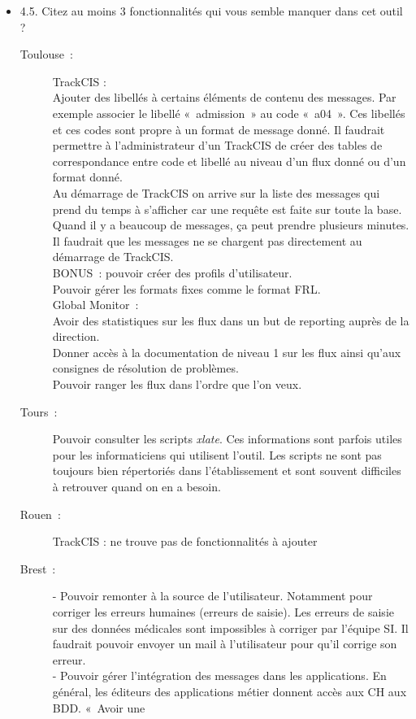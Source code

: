 \begin{itemize}
	  \item 4.5. Citez au moins 3 fonctionnalités qui vous semble manquer dans cet
	  outil ?
	  \begin{description}
	  	\item[Toulouse~:] TrackCIS :\\
		Ajouter des libellés à certains éléments de contenu des messages. Par exemple
		associer le libellé «~admission~» au code «~a04~». Ces libellés et ces codes
		sont propre à un format de message donné. Il faudrait permettre à
		l’administrateur d’un TrackCIS de créer des tables de correspondance entre code et
		libellé au niveau d’un flux donné ou d’un format donné.\\
		Au démarrage de TrackCIS on arrive sur la liste des messages qui prend du
		temps à s’afficher car une requête est faite sur toute la base. Quand il y a beaucoup
		de messages, ça peut prendre plusieurs minutes. Il faudrait que les messages
		ne se chargent pas directement au démarrage de TrackCIS.\\
		BONUS~: pouvoir créer des profils d’utilisateur.\\
		Pouvoir gérer les formats fixes comme le format FRL.\\
		Global Monitor~:\\
		Avoir des statistiques sur les flux dans un but de reporting auprès de la
		direction.\\
		Donner accès à la documentation de niveau 1 sur les flux ainsi qu’aux
		consignes de résolution de problèmes.\\
		Pouvoir ranger les flux dans l’ordre
		que l’on veux.
	  	\item[Tours~:] Pouvoir consulter les scripts \textit{xlate}. Ces
	  	informations sont parfois utiles pour les informaticiens qui utilisent l’outil. Les scripts
	  	ne sont pas toujours bien répertoriés dans l’établissement et sont souvent
	  	difficiles à retrouver quand on en a besoin.
	  	\item[Rouen~:] TrackCIS : ne trouve pas de fonctionnalités à ajouter
	  	\item[Brest~:] - Pouvoir remonter à la source de l’utilisateur. Notamment
	  	pour corriger les erreurs humaines (erreurs de saisie). Les erreurs de
	  	saisie sur des données médicales sont impossibles à corriger par l’équipe
	  	SI. Il faudrait pouvoir envoyer un mail à l’utilisateur pour qu’il corrige
	  	son erreur.\\
		- Pouvoir gérer l’intégration des messages dans les applications. En général,
		les éditeurs des applications métier donnent accès aux CH aux BDD. «~Avoir une

\end{description}
\end{itemize}
